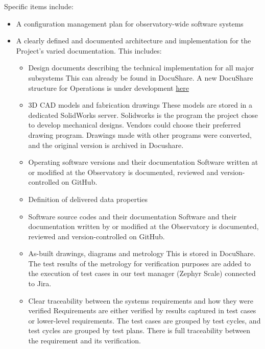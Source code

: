 Specific items include:

\begin{itemize}
	\item A configuration management plan for observatory-wide software systems
	
	\item A clearly defined and documented architecture and implementation for the Project's varied documentation.  This includes:
	\begin{itemize}
		\item Design documents describing the technical implementation for all major subsystems
		This can already be found in DocuShare. 
		A new DocuShare structure for Operations is under development \href{https://docushare.lsst.org/docushare/dsweb/View/Collection-15974}{here}
			
		\item 3D CAD models and fabrication drawings
		These models are stored in a dedicated SolidWorks server. Solidworks is the program the project chose to develop mechanical designs. 
		Vendors could choose their preferred drawing program. Drawings made with other programs were converted, and the original version is archived in Docushare.
		
		\item Operating software versions and their documentation
		Software written at or modified at the Observatory is documented, reviewed and version-controlled on GitHub.
		
		\item Definition of delivered data properties
		
		\item Software source codes and their documentation
		Software and their documentation written by or modified at the Observatory is documented, reviewed and version-controlled on GitHub.
		
		\item As-built drawings, diagrams and metrology
		This is stored in DocuShare. 
		The test results of the metrology for verification purposes are added to the execution of test cases in our test manager (Zephyr Scale) connected to Jira.
		
		\item Clear traceability between the systems requirements and how they were verified
		Requirements are either verified by results captured in test cases or lower-level requirements. 
		The test cases are grouped by test cycles, and test cycles are grouped by test plans. 
		There is full traceability between the requirement and its verification.
		

\end{itemize}
\end{itemize}
